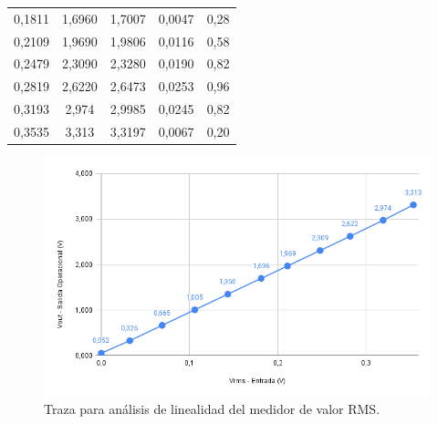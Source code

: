 \begin{table}[h!]
\begin{tabular}{ccccc}
		0,1811                                             & 1,6960                                             & 1,7007                                                       & 0,0047                                                        & 0,28                                                        \\
		0,2109                                             & 1,9690                                             & 1,9806                                                       & 0,0116                                                        & 0,58                                                        \\
		0,2479                                             & 2,3090                                             & 2,3280                                                       & 0,0190                                                        & 0,82                                                        \\
		0,2819                                             & 2,6220                                             & 2,6473                                                       & 0,0253                                                        & 0,96                                                        \\
		0,3193                                             & 2,974                                              & 2,9985                                                       & 0,0245                                                        & 0,82                                                        \\
		0,3535                                             & 3,313                                              & 3,3197                                                       & 0,0067                                                        & 0,20                                                        \\
		\hline
	\end{tabular}\label{tabla_ensayo_medidor_RMS}
\end{table}
\begin{figure}[h!]
	\centering
	\includegraphics[width=1.0\linewidth]{Figures/ensayo_inealidad_medidor_RMS}
	\caption{Traza para análisis de linealidad del medidor de valor RMS.}
	\label{fig:ensayoinealidadmedidorrms}
\end{figure}\\
